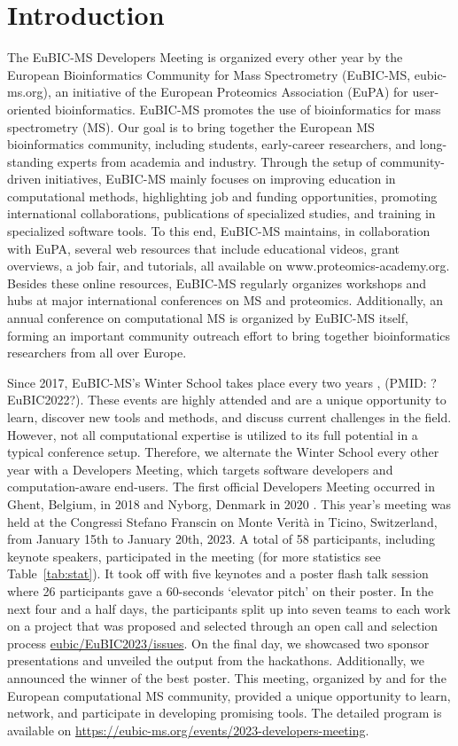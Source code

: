 \section{Introduction}
The EuBIC-MS Developers Meeting is organized every other year by the European Bioinformatics Community for Mass Spectrometry (EuBIC-MS, eubic-ms.org), an initiative of the European Proteomics Association (EuPA) for user-oriented bioinformatics. EuBIC-MS promotes the use of bioinformatics for mass spectrometry (MS). Our goal is to bring together the European MS bioinformatics community, including students, early-career researchers, and long-standing experts from academia and industry. Through the setup of community-driven initiatives, EuBIC-MS mainly focuses on improving education in computational methods, highlighting job and funding opportunities, promoting international collaborations, publications of specialized studies, and training in specialized software tools. To this end, EuBIC-MS maintains, in collaboration with EuPA, several web resources that include educational videos, grant overviews, a job fair, and tutorials, all available on www.proteomics-academy.org. Besides these online resources, EuBIC-MS regularly organizes workshops and hubs at major international conferences on MS and proteomics. Additionally, an annual conference on computational MS is organized by EuBIC-MS itself, forming an important community outreach effort to bring together bioinformatics researchers from all over Europe.

Since 2017, EuBIC-MS's Winter School takes place every two years \citep{pmid28385664}, (PMID: ?EuBIC2022?). These events are highly attended and are a unique opportunity to learn, discover new tools and methods, and discuss current challenges in the field. However, not all computational expertise is utilized to its full potential in a typical conference setup. Therefore, we alternate the Winter School every other year with a Developers Meeting, which targets software developers and computation-aware end-users. The first official Developers Meeting occurred in Ghent, Belgium, in 2018 \citep{pmid29864591} and Nyborg, Denmark in 2020 \citep{EuBIC-MS2020}. This year's meeting was held at the Congressi Stefano Franscin on Monte Verità in Ticino, Switzerland, from January 15th to January 20th, 2023. A total of 58 participants, including keynote speakers, participated in the meeting (for more statistics see Table~\ref{tab:stat}).  It took off with five keynotes and a poster flash talk session where 26 participants gave a 60-seconds `elevator pitch' on their poster. In the next four and a half days, the participants split up into seven teams to each work on a project that was proposed and selected through an open call and selection process \href{https://github.com/eubic/EuBIC2023/issues}{eubic/EuBIC2023/issues}. On the final day, we showcased two sponsor presentations and unveiled the output from the hackathons. Additionally, we announced the winner of the best poster. This meeting, organized by and for the European computational MS community, provided a unique opportunity to learn, network, and participate in developing promising tools. The detailed program is available on \url{https://eubic-ms.org/events/2023-developers-meeting}.

